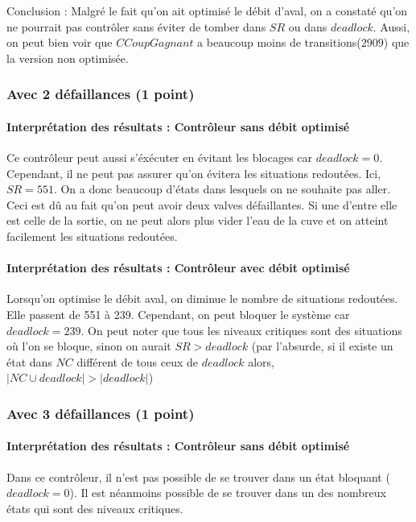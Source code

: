 \documentclass[a4paper]{book}
\begin{document}
Conclusion : Malgré le fait qu'on ait optimisé le débit d'aval, on a constaté qu'on ne pourrait pas contrôler sans éviter de tomber dans $SR$ ou dans $deadlock$.
Aussi, on peut bien voir que $CCoupGagnant$ a beaucoup moins de transitions($2909$) que la version non optimisée.

\subsubsection{Avec 2 défaillances (1 point)}


%
%
%
\paragraph{Interprétation des résultats : Contrôleur sans débit optimisé}
Ce contrôleur peut aussi s'éxécuter en évitant les blocages car $deadlock = 0$. Cependant, il ne peut pas assurer qu'on évitera les situations redoutées.
Ici, $SR = 551$. On a donc beaucoup d'états dans lesquels on ne souhaite pas aller. Ceci est dû au fait qu'on peut avoir deux valves défaillantes.
Si une d'entre elle est celle de la sortie, on ne peut alors plus vider l'eau de la cuve et on atteint facilement les situations redoutées.

\paragraph{Interprétation des résultats : Contrôleur avec débit optimisé}

Lorsqu'on optimise le débit aval, on diminue le nombre de situations redoutées. Elle passent de 551 à 239. Cependant, on peut bloquer le système
car $deadlock = 239$. On peut noter que tous les niveaux critiques sont des situations où l'on se bloque, sinon on aurait $SR > deadlock$ (par l'absurde, si il existe un état dans $NC$ différent de tous ceux de $deadlock$ alors, $|NC \cup deadlock| > |deadlock|$)


\subsubsection{Avec 3 défaillances (1 point)}


%
%
%
\paragraph{Interprétation des résultats : Contrôleur sans débit optimisé}
Dans ce contrôleur, il n'est pas possible de se trouver dans un état bloquant ($deadlock = 0$). Il est néanmoins possible de se trouver dans un des nombreux états qui sont des niveaux critiques.
\end{document}
